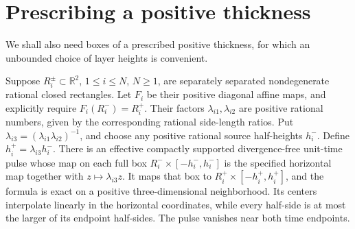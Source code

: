 \section{Prescribing a positive thickness}\label{sec:sheets-boxes}
We shall also need boxes of a prescribed positive thickness, for which
an unbounded choice of layer heights is convenient.
\begin{lemma}
\label{lem:sa-full-box-layers}\label{lem:sb-boxes}
Suppose $R_i^\pm\subset\mathbb R^2$, $1\le i\le N$, $N\ge1$,
are separately separated nondegenerate rational closed rectangles.
Let $F_i$ be their positive diagonal affine maps, and explicitly require
$F_i(R_i^-)=R_i^+$. Their factors $\lambda_{i1},\lambda_{i2}$ are
positive rational numbers, given by the corresponding rational side-length
ratios. Put
$\lambda_{i3}=(\lambda_{i1}\lambda_{i2})^{-1}$, and choose any positive
rational source half-heights $h_i^-$. Define $h_i^+=\lambda_{i3}h_i^-$.
There is an effective compactly supported divergence-free unit-time pulse
whose map on each full box $R_i^-\times[-h_i^-,h_i^-]$ is the specified
horizontal map together with $z\mapsto\lambda_{i3}z$. It maps that box
to $R_i^+\times[-h_i^+,h_i^+]$, and the formula is exact on a positive
three-dimensional neighborhood. Its centers interpolate linearly in the
horizontal coordinates, while every half-side is at most the larger of
its endpoint half-sides. The pulse vanishes near both time endpoints.
\end{lemma}
